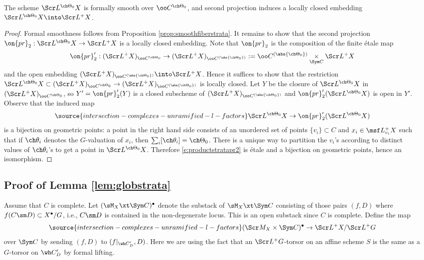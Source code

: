 \begin{prop}
\notready \label{prop:smoothstrata}
The scheme $\Scr L^{\ch\Theta_0} X$ is formally smooth over $\oo C^{\ch\Theta_0}$,
and second projection induces a locally closed embedding $\Scr L^{\ch\Theta_0}X \into
\Scr L^+ X$.
\end{prop}
\begin{proof}
Formal smoothness follows from Proposition \ref{prop:smoothfiberstrata}.
It remains to show that the second projection
$\on{pr}_2 : \Scr L^{\ch\Theta_0} X \to \Scr L^+ X$
is a locally closed embedding.
Note that $\on{pr}_2$ is the composition of the finite \'etale map
\[ \on{pr}'_2: (\Scr L^+ X)_{\oo C^{\ch\Theta_0}} \to
(\Scr L^+ X)_{\oo C^{( \abs{\ch\Theta_0})}} := \oo C^{(\abs{\ch\Theta_0})} \underset{\Sym C}\times \Scr L^+ X \]
and the open embedding $(\Scr L^+ X)_{\oo C^{(\abs{\ch\Theta_0})}} \into \Scr L^+ X$.
Hence it suffices to show that the restriction
$\Scr L^{\ch\Theta_0} X  \subset (\Scr L^+ X)_{\oo C^{\ch\Theta_0}} \to
(\Scr L^+ X)_{\oo C^{(\abs{\ch\Theta_0})}}$
is locally closed.
Let $Y$ be the closure of $\Scr L^{\ch\Theta_0} X$ in $(\Scr L^+ X)_{\oo C^{\ch\Theta_0}}$,
so $Y'=\on{pr}'_2(Y)$ is
a closed subscheme of $(\Scr L^+ X)_{\oo C^{(\abs{\ch\Theta_0})}}$
and $\on{pr}'_2(\Scr L^{\ch\Theta_0} X)$ is open in $Y'$.
Observe that the induced map
\begin{equation} \label{e:productstratapr2}
\source{intersection-complexes-unramified-l-factors}
\Scr L^{\ch\Theta_0} X \to \on{pr}'_2(\Scr L^{\ch\Theta_0} X)
\end{equation}
is a bijection on geometric points:
a point in the right hand side consists of an unordered set of points $\{ v_i \} \subset C$
and $x_i \in \msf L^+_{v_i} X$ such that if $\ch\theta_i$ denotes the $G$-valuation
of $x_i$, then $\sum_i [\ch\theta_i] = \ch\Theta_0$.
There is a unique way to partition the $v_i$'s according to distinct values of $\ch\theta_i$'s
to get a point in $\Scr L^{\ch\Theta_0} X$.
Therefore \eqref{e:productstratapr2} is \'etale and a bijection on geometric points, hence
an isomorphism.
\end{proof}

\subsection{Proof of Lemma {\ref{lem:globstrata}}}
\label{proof:globstrata}

Assume that $C$ is complete.
Let $(\sM_X \xt \Sym C)^\bullet$ denote the substack of $\sM_X \xt\Sym C$
consisting of those pairs $(f,D)$ where $f(C \sm D) \subset X^\bullet/G$, i.e.,
$C\sm D$ is contained in the non-degenerate locus.
This is an open substack since $C$ is complete.
Define the map
\begin{equation} \label{e:MtoLX}
\source{intersection-complexes-unramified-l-factors}
    (\Scr M_X \times \Sym C)^\bullet \to \Scr L^+ X / \Scr L^+G
\end{equation}
over $\Sym C$ by sending $(f,D)$ to $(f|_{\wh C'_D}, D)$.
Here we are using the fact that an $\Scr L^+G$-torsor on an affine scheme $S$
is the same as a $G$-torsor on $\wh C'_D$ by formal lifting.


